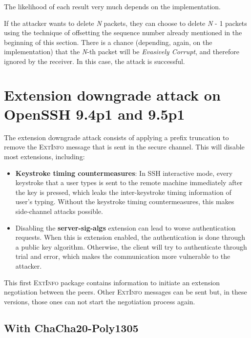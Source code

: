 \documentclass[journal=tches,final]{iacrtrans}
\begin{document}
The likelihood of each result very much depends on the implementation.

If the attacker wants to delete \textit{N} packets, they can choose to delete \textit{N} - 1 packets using the technique of offsetting the sequence number already mentioned in the beginning of this section. There is a chance (depending, again, on the implementation) that the \textit{N}-th packet will be \textit{Evasively Corrupt}, and therefore ignored by the receiver. In this case, the attack is successful.

\section{Extension downgrade attack on OpenSSH 9.4p1 and 9.5p1}
\label{sec:extension-downgrade}

The extension downgrade attack consists of applying a prefix truncation to remove the \textsc{ExtInfo} message that is sent in the secure channel. This will disable most extensions, including:

\begin{itemize}
    \item \textbf{Keystroke timing countermeasures}: In SSH interactive mode, every keystroke that a user types is sent to the remote machine immediately after the key is pressed, which leaks the inter-keystroke timing information of user’s typing. Without the keystroke timing countermeasures, this makes side-channel attacks possible. \cite{keystore-timing-attack}
    \item Disabling the \textbf{server-sig-algs} extension can lead to worse authentication requests. When this is extension enabled, the authentication is done through a public key algorithm. Otherwise, the client will try to authenticate through trial and error, which makes the communication more vulnerable to the attacker. \cite{extension-server-sig-algs}
\end{itemize}

This first \textsc{ExtInfo} package contains information to initiate an extension negotiation between the peers. Other \textsc{ExtInfo} messages can be sent but, in these versions, those ones can not start the negotiation process again.

\subsection{With ChaCha20-Poly1305}
\label{sec:downgrade-ChaCha20-Poly1305}
\end{document}
